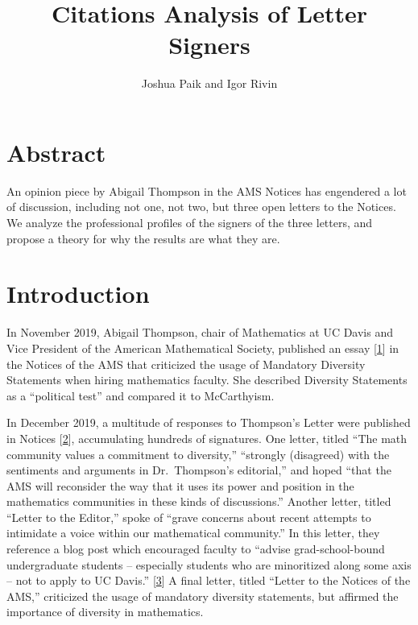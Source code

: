 \documentclass[]{article}
\title{Citations Analysis of Letter Signers}
\author{Joshua Paik and Igor Rivin}
\date{}
\begin{document}
\maketitle

{
\setcounter{tocdepth}{2}
\tableofcontents
}
\hypertarget{abstract}{%
\section{Abstract}\label{abstract}}

An opinion piece by Abigail Thompson in the AMS Notices has engendered a
lot of discussion, including not one, not two, but three open letters to
the Notices. We analyze the professional profiles of the signers of the
three letters, and propose a theory for why the results are what they
are.

\hypertarget{introduction}{%
\section{Introduction}\label{introduction}}

In November 2019, Abigail Thompson, chair of Mathematics at UC Davis and
Vice President of the American Mathematical Society, published an essay
{[}\protect\hyperlink{Bibliography}{1}{]} in the Notices of the AMS that
criticized the usage of Mandatory Diversity Statements when hiring
mathematics faculty. She described Diversity Statements as a ``political
test'' and compared it to McCarthyism.

In December 2019, a multitude of responses to Thompson's Letter were
published in Notices {[}\protect\hyperlink{Bibliography}{2}{]},
accumulating hundreds of signatures. One letter, titled ``The math
community values a commitment to diversity,'' ``strongly (disagreed)
with the sentiments and arguments in Dr.~Thompson's editorial,'' and
hoped ``that the AMS will reconsider the way that it uses its power and
position in the mathematics communities in these kinds of discussions.''
Another letter, titled ``Letter to the Editor,'' spoke of ``grave
concerns about recent attempts to intimidate a voice within our
mathematical community.'' In this letter, they reference a blog post
which encouraged faculty to ``advise grad-school-bound undergraduate
students -- especially students who are minoritized along some axis --
not to apply to UC Davis.'' {[}\protect\hyperlink{Bibliography}{3}{]} A
final letter, titled ``Letter to the Notices of the AMS,'' criticized
the usage of mandatory diversity statements, but affirmed the importance
of diversity in mathematics.
\end{document}
